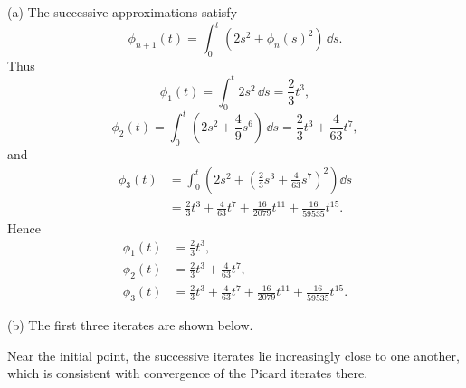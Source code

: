 \documentclass[11pt,oneside]{article}
\begin{document}
\begin{solution}
\noindent\textup{(a)} The successive approximations satisfy
\[
    \phi_{n+1}(t)
    =\int_0^t\left(2s^2+\phi_n(s)^2\right)\,\dd s.
\]
Thus
\[
    \phi_1(t)=\int_0^t2s^2\,\dd s
    =\frac23t^3,
\]
\[
    \phi_2(t)
    =\int_0^t\left(2s^2+\frac49s^6\right)\,\dd s
    =\frac23t^3+\frac4{63}t^7,
\]
and
\[
\begin{aligned}
    \phi_3(t)
    &=\int_0^t\left(2s^2+
        \left(\frac23s^3+\frac4{63}s^7\right)^2\right) \dd s \\
    &=\frac23t^3+\frac4{63}t^7
      +\frac{16}{2079}t^{11}
      +\frac{16}{59535}t^{15}.
\end{aligned}
\]
Hence
\[
    \boxed{
    \begin{aligned}
        \phi_1(t)&=\frac23t^3,\\
        \phi_2(t)&=\frac23t^3+\frac4{63}t^7,\\
        \phi_3(t)&=\frac23t^3+\frac4{63}t^7
        +\frac{16}{2079}t^{11}+\frac{16}{59535}t^{15}.
    \end{aligned}}
\]

\medskip
\noindent\textup{(b)} The first three iterates are shown below.

\begin{center}
\end{center}

Near the initial point, the successive iterates lie increasingly close to one another, which is consistent with convergence of the Picard iterates there.
\end{solution}
\end{document}
